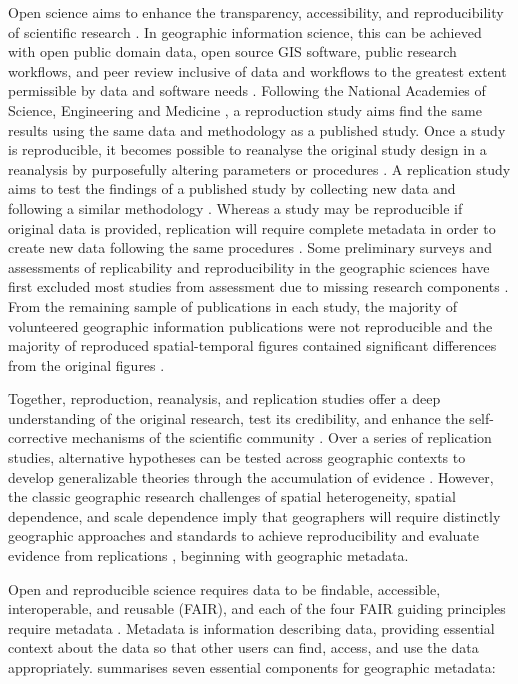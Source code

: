 \documentclass{isprs} %
\begin{document}
Open science aims to enhance the transparency, accessibility, and reproducibility of scientific research \citep{NASEM2018}.
In geographic information science, this can be achieved with open public domain data, open source GIS software, public research workflows, and peer review inclusive of data and workflows to the greatest extent permissible by data and software needs \citep{Singleton2016}. 
Following the National Academies of Science, Engineering and Medicine \citep{NASEM2019}, a reproduction study aims find the same results using the same data and methodology as a published study.
Once a study is reproducible, it becomes possible to reanalyse the original study design in a reanalysis by purposefully altering parameters or procedures \citep{Christensen2019}. 
A replication study aims to test the findings of a published study by collecting new data and following a similar methodology \citep{NASEM2019}.
Whereas a study may be reproducible if original data is provided, replication will require complete metadata in order to create new data following the same procedures \citep{Ostermann2017}.
Some preliminary surveys and assessments of replicability and reproducibility in the geographic sciences have first excluded most studies from assessment due to missing research components \citep{Ostermann2017,Konkol2019}.
From the remaining sample of publications in each study, the majority of volunteered geographic information publications were not reproducible \citep{Ostermann2017} and the majority of reproduced spatial-temporal figures contained significant differences from the original figures \citep{Konkol2019}.

Together, reproduction, reanalysis, and replication studies offer a deep understanding of the original research, test its credibility, and enhance the self-corrective mechanisms of the scientific community \citep{Christensen2019,NASEM2019}.
Over a series of replication studies, alternative hypotheses can be tested across geographic contexts to develop generalizable theories through the accumulation of evidence \citep{Kedron2022}.
However, the classic geographic research challenges of spatial heterogeneity, spatial dependence, and scale dependence imply that geographers will require distinctly geographic approaches and standards to achieve reproducibility \citep{Kedron2021,Brunsdon2020} and evaluate evidence from replications \citep{Kedron2022}, beginning with geographic metadata.

Open and reproducible science requires data to be findable, accessible, interoperable, and reusable (FAIR), and each of the four FAIR guiding principles require metadata \citep{Wilkinson2016, NASEM2018}.
Metadata is information describing data, providing essential context about the data so that other users can find, access, and use the data appropriately.
\citet{Kim1999} summarises seven essential components for geographic metadata:
\end{document}
